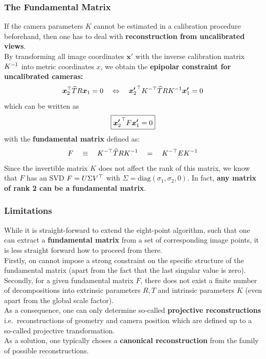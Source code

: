 \subsubsection*{The Fundamental Matrix}%
\label{ssub:the_fundamental_matrix}

If the camera parameters $K$ cannot be estimated in a calibration procedure beforehand,
then one has to deal with \textbf{reconstruction from uncalibrated views}.\\

By transforming all image coordinates $\bm{x}'$ with the inverse calibration
matrix $K^{-1}$ into metric coordinates $x$, we obtain the
\textbf{epipolar constraint for uncalibrated cameras:}
\[
	\bm{x}_2^{\top} \widehat{T} R \bm{x}_1 = 0
	\quad \Leftrightarrow \quad
	{\bm{x'}_2}^{\top} K^{-\top} \widehat{T} R K^{-1} \bm{x'}_1 = 0
\]
which can be written as
\[
	\boxed{ {\bm{x'}_2}^{\top} F \bm{x'}_1 = 0 }
\]
with the \textbf{fundamental matrix} defined as:
\[
	F
		\quad \equiv \quad
		K^{-\top} \widehat{T} R K^{-1}
		\quad = \quad
		K^{-\top} E K^{-1}
\]
Since the invertible matrix $K$ does not affect the rank of this matrix,
we know that $F$ has an SVD $F = U \Sigma V^{\top}$ with
$\Sigma = \text{diag} ( \sigma_1, \sigma_2, 0 )$.
In fact, \textbf{any matrix of rank 2 can be a fundamental matrix}.


\subsubsection*{Limitations}%
\label{ssub:limitations}

While it is straight-forward to extend the eight-point algorithm,
such that one can extract a \textbf{fundamental matrix} from a set
of corresponding image points, it is less straight forward how to proceed from there.\\

Firstly, on cannot impose a strong constraint on the specific structure
of the fundamental matrix (apart from the fact that the last singular value is zero).\\

Secondly, for a given fundamental matrix $F$, there does not exist a finite
number of decompositions into extrinsic parameters $R,T$ and intrinsic
parameters $K$ (even apart from the global scale factor).\\

As a consequence, one can only determine so-called \textbf{projective reconstructions}
i.e.\ reconstructions of geometry and camera position which are defined
up to a so-called projective transformation.\\

As a solution, one typically choses a \textbf{canonical reconstruction}
from the family of possible reconstructions.
